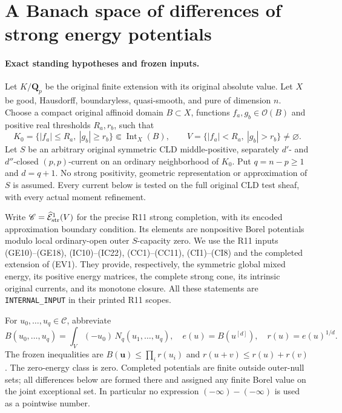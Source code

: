 \section{A Banach space of differences of strong energy potentials}
\label{sec:r12-energy-difference}

\paragraph{Exact standing hypotheses and frozen inputs.}
Let $K/\mathbf Q_p$ be the original finite extension with its original
absolute value. Let $X$ be good, Hausdorff, boundaryless, quasi-smooth,
and pure of dimension $n$. Choose a compact original affinoid domain
$B\subset X$, functions $f_a,g_b\in\mathcal O(B)$ and positive real
thresholds $R_a,r_b$, such that
\[
 K_0=\{|f_a|\leq R_a,\ |g_b|\geq r_b\}
                         \Subset\operatorname{Int}_X(B),\qquad
 V=\{|f_a|<R_a,\ |g_b|>r_b\}\ne\varnothing .
 \tag{ED1}
\]
Let $S$ be an arbitrary original symmetric CLD middle-positive,
separately $d'$- and $d''$-closed $(p,p)$-current on an ordinary
neighborhood of $K_0$. Put $q=n-p\geq1$ and $d=q+1$.
No strong positivity, geometric representation or approximation of
$S$ is assumed. Every current below is tested on the full original
CLD test sheaf, with every actual moment refinement.

Write $\mathscr C=\widehat{\mathcal E}^{1}_{\rm str}(V)$ for the
precise R11 strong completion, with its encoded approximation
boundary condition. Its elements are nonpositive Borel potentials
modulo local ordinary-open outer $S$-capacity zero. We use the R11
inputs (GE10)--(GE18), (IC10)--(IC22), (CC1)--(CC11), (CI1)--(CI8)
and the completed extension of (EV1). They provide, respectively,
the symmetric global mixed energy, its positive energy matrices,
the complete strong cone, its intrinsic original currents, and its
monotone closure. All these statements are \texttt{INTERNAL\_INPUT}
in their printed R11 scopes.

For $u_0,\ldots,u_q\in\mathscr C$, abbreviate
\[
 B(u_0,\ldots,u_q)=\int_V(-u_0)\,\widehat N_q(u_1,\ldots,u_q),
 \quad e(u)=B(u^{[d]}),\quad r(u)=e(u)^{1/d}.
 \tag{ED2}
\]
The frozen inequalities are $B(\mathbf u)\leq\prod_i r(u_i)$ and
$r(u+v)\leq r(u)+r(v)$. The zero-energy class is zero. Completed
potentials are finite outside outer-null sets; all differences below
are formed there and assigned any finite Borel value on the joint
exceptional set. In particular no expression $(-\infty)-(-\infty)$
is used as a pointwise number.

